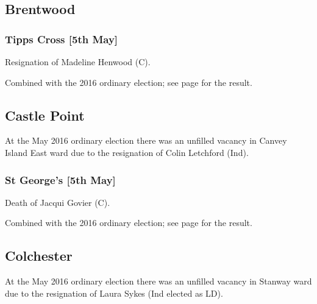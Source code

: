 \documentclass[a4paper,openany]{book}
\begin{document}
\begin{resultsiii}
\subsection*{Brentwood}

\subsubsection*{Tipps Cross \hspace*{\fill}\nolinebreak[1]%
\enspace\hspace*{\fill}
[5th May]}


Resignation of Madeline Henwood (C).

Combined with the 2016 ordinary election; see page \pageref{TippsCrossBrentwood} for the result.

\subsection*{Castle Point}

At the May 2016 ordinary election there was an unfilled vacancy in Canvey Island East ward due to the resignation of Colin Letchford (Ind).

\subsubsection*{St George's \hspace*{\fill}\nolinebreak[1]%
\enspace\hspace*{\fill}
[5th May]}


Death of Jacqui Govier (C).

Combined with the 2016 ordinary election; see page \pageref{StGeorgesCastlePoint} for the result.

\subsection*{Colchester}

At the May 2016 ordinary election there was an unfilled vacancy in Stanway ward due to the resignation of Laura Sykes (Ind elected as LD).


\end{resultsiii}
\end{document}
